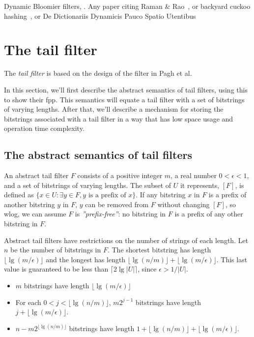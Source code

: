 \documentclass[11pt,letterpaper]{article}
\begin{document}
Dynamic Bloomier filters, \cite{DBLP:journals/corr/abs-cs-0502032}. Any paper citing Raman \& Rao~\cite{raman2003succinct}, or backyard cuckoo hashing~\cite{DBLP:journals/corr/abs-0912-5424}, or De Dictionariis Dynamicis Pauco Spatio Utentibus~\cite{DBLP:journals/corr/abs-cs-0512081}

\section{The tail filter}

The {\em tail filter} is based on the design of the filter in Pagh et al.~\cite{DBLP:journals/corr/abs-1304-1188}

In this section, we'll first describe the abstract semantics of tail filters, using this to show their fpp.
This semantics will equate a tail filter with a set of bitstrings of varying lengths.
After that, we'll describe a mechanism for storing the bitstrings associated with a tail filter in a way that has low space usage and operation time complexity.

\subsection{The abstract semantics of tail filters}

An abstract tail filter $F$ consists of a positive integer $m$, a real number $0 < \epsilon < 1$, and a set of bitstrings of varying lengths. %
The subset of $U$ it represents, $[F]$, is defined as $\{x \in U : \exists y \in F, y \textrm{ is a prefix of } x\}$.
If any bitstring $x$ in $F$ is a prefix of another bitstring $y$ in $F$, $y$ can be removed from $F$ without changing $[F]$, so wlog, we can assume $F$ is {\em ''prefix-free''}: no bitstring in $F$ is a prefix of any other bitstring in $F$.


Abstract tail filters have restrictions on the number of strings of each length.
Let $n$ be the number of bitstrings in $F$.
The shortest bitstring has length $\lfloor \lg (m / \epsilon) \rfloor$ and the longest has length $\lfloor \lg (n/m) \rfloor + \lfloor \lg (m / \epsilon) \rfloor$.
This last value is guaranteed to be less than $\lceil 2 \lg |U| \rceil$, since $\epsilon > 1/|U|$.

\begin {itemize}
\item $m$ bitstrings have length $\lfloor \lg (m / \epsilon) \rfloor$
\item For each $0 < j < \lfloor \lg (n/m) \rfloor $, $m2^{j-1}$ bitstrings have length $j + \lfloor \lg (m / \epsilon) \rfloor$.
\item $n - m2^{\lfloor \lg (n/m) \rfloor}$ bitstrings have length $1 + \lfloor \lg (n/m) \rfloor  + \lfloor \lg (m / \epsilon) \rfloor$.
\end {itemize}
\end{document}
